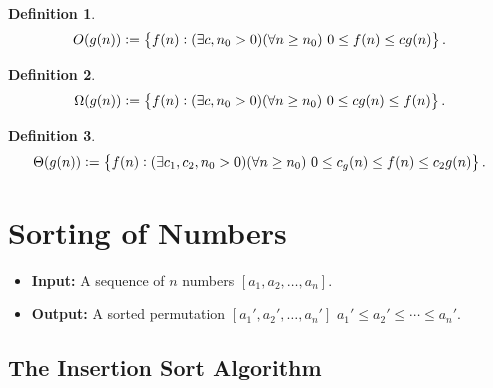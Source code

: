 \documentclass[12pt,openany]{book}
\theoremstyle{definition}
\newtheorem{definition}{Definition}[chapter]
\begin{document}
	\begin{tcolorbox}[colframe=defcolor,title={\color{white}\bf Asymptotic Upper Bound}]
		\begin{definition}
			\[
			O(g(n)):=\set{f(n):(\exists c,n_0>0)(\forall n\geq n_0)\ 0\leq f(n)\leq cg(n)}.
			\]
		\end{definition}
	\end{tcolorbox}
	\begin{tcolorbox}[colframe=defcolor,title={\color{white}\bf Asymptotic Lower Bound}]
		\begin{definition}
			\[
			\Omega(g(n)):=\set{f(n):(\exists c,n_0>0)(\forall n\geq n_0)\ 0\leq cg(n)\leq f(n)}.
			\]
		\end{definition}
	\end{tcolorbox}
	\begin{tcolorbox}[colframe=defcolor,title={\color{white}\bf Asymptotic Tight Bound}]
		\begin{definition}
			\[
			\Theta(g(n)):=\set{f(n):(\exists c_1,c_2,n_0>0)(\forall n\geq n_0)\ 0\leq c_g(n)\leq f(n)\leq c_2g(n)}.
			\]
		\end{definition}
	\end{tcolorbox}
	
	\newpage
	\chapter{Sorting of Numbers}
	\begin{itemize}
		\item \textbf{Input:} A sequence of $n$ numbers $[a_1,a_2,\dots,a_n]$.
		\item \textbf{Output:} A sorted permutation $
		[a_1',a_2',\dots,a_n']$  $a_1'\leq a_2'\leq\cdots\leq a_n'.$
	\end{itemize}
	
	\section{The Insertion Sort Algorithm}
	
\end{document}

